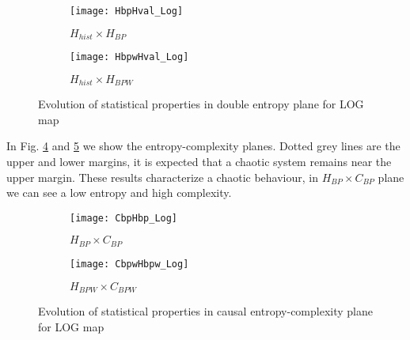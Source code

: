 \begin{figure}[htpb]
	\centering
	\begin{subfigure}[b]{0.49\textwidth}
		\texttt{[image: HbpHval\_Log]}
		\caption{$H_{hist} \times H_{BP}$}
		\label{fig:HbpHval_Log}
	\end{subfigure}
	\begin{subfigure}[b]{0.49\textwidth}
		\texttt{[image: HbpwHval\_Log]}
		\caption{$H_{hist} \times H_{BPW}$}
		\label{fig:HbpwHval_Log}
	\end{subfigure}
	\caption{Evolution of statistical properties in double entropy plane for LOG map}
	\label{fig:LOG_HH}
\end{figure}

In Fig. \ref{fig:CbpHbp_Log} and \ref{fig:CbpwHbpw_Log} we show the entropy-complexity planes.
Dotted grey lines are the upper and lower margins, it is expected that a chaotic system remains near the upper margin.
These results characterize a chaotic behaviour, in $H_{BP} \times C_{BP}$ plane we can see a low entropy and high complexity.

\begin{figure}[htpb]
	\centering
	\begin{subfigure}[b]{0.49\textwidth}
		\texttt{[image: CbpHbp\_Log]}
		\caption{$H_{BP} \times C_{BP}$}
		\label{fig:CbpHbp_Log}
	\end{subfigure}
	\begin{subfigure}[b]{0.49\textwidth}
		\texttt{[image: CbpwHbpw\_Log]}
		\caption{$H_{BPW} \times C_{BPW}$}
		\label{fig:CbpwHbpw_Log}
	\end{subfigure}
	\caption{Evolution of statistical properties in causal entropy-complexity plane for LOG map}
	\label{fig:LOG_HC}
\end{figure}
